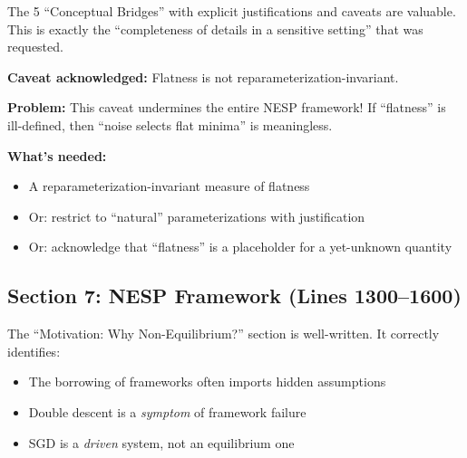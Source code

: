 \documentclass[11pt]{article}
\begin{document}
\begin{insightbox}
The 5 ``Conceptual Bridges'' with explicit justifications and caveats are valuable. This is exactly the ``completeness of details in a sensitive setting'' that was requested.
\end{insightbox}

\begin{vuongmacbox}
\textbf{Caveat acknowledged:} Flatness is not reparameterization-invariant.

\textbf{Problem:} This caveat undermines the entire NESP framework! If ``flatness'' is ill-defined, then ``noise selects flat minima'' is meaningless.

\textbf{What's needed:}
\begin{itemize}
    \item A reparameterization-invariant measure of flatness
    \item Or: restrict to ``natural'' parameterizations with justification
    \item Or: acknowledge that ``flatness'' is a placeholder for a yet-unknown quantity
\end{itemize}
\end{vuongmacbox}

\subsection{Section 7: NESP Framework (Lines 1300--1600)}

\begin{insightbox}
The ``Motivation: Why Non-Equilibrium?'' section is well-written. It correctly identifies:
\begin{itemize}
    \item The borrowing of frameworks often imports hidden assumptions
    \item Double descent is a \emph{symptom} of framework failure
    \item SGD is a \emph{driven} system, not an equilibrium one
\end{itemize}
\end{insightbox}
\end{document}
